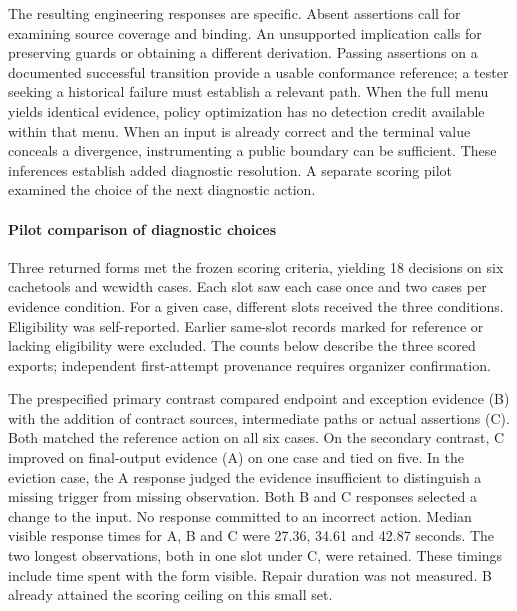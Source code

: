 \documentclass[conference]{IEEEtran}
\begin{document}
The resulting engineering responses are specific. Absent assertions call for examining source coverage and binding. An unsupported implication calls for preserving guards or obtaining a different derivation. Passing assertions on a documented successful transition provide a usable conformance reference; a tester seeking a historical failure must establish a relevant path. When the full menu yields identical evidence, policy optimization has no detection credit available within that menu. When an input is already correct and the terminal value conceals a divergence, instrumenting a public boundary can be sufficient. These inferences establish added diagnostic resolution. A separate scoring pilot examined the choice of the next diagnostic action.

\paragraph{Pilot comparison of diagnostic choices}
Three returned forms met the frozen scoring criteria, yielding 18 decisions on six cachetools and wcwidth cases. Each slot saw each case once and two cases per evidence condition. For a given case, different slots received the three conditions. Eligibility was self-reported. Earlier same-slot records marked for reference or lacking eligibility were excluded. The counts below describe the three scored exports; independent first-attempt provenance requires organizer confirmation.

The prespecified primary contrast compared endpoint and exception evidence (B) with the addition of contract sources, intermediate paths or actual assertions (C). Both matched the reference action on all six cases. On the secondary contrast, C improved on final-output evidence (A) on one case and tied on five. In the eviction case, the A response judged the evidence insufficient to distinguish a missing trigger from missing observation. Both B and C responses selected a change to the input. No response committed to an incorrect action. Median visible response times for A, B and C were 27.36, 34.61 and 42.87 seconds. The two longest observations, both in one slot under C, were retained. These timings include time spent with the form visible. Repair duration was not measured. B already attained the scoring ceiling on this small set.
\end{document}
